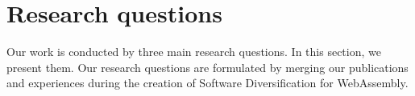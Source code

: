 










\section{Research questions}
\label{intro:definition:rq}

Our work is conducted by three main research questions.
In this section, we present them. 
Our research questions are formulated by merging our publications and experiences during the creation of Software Diversification for WebAssembly. 

